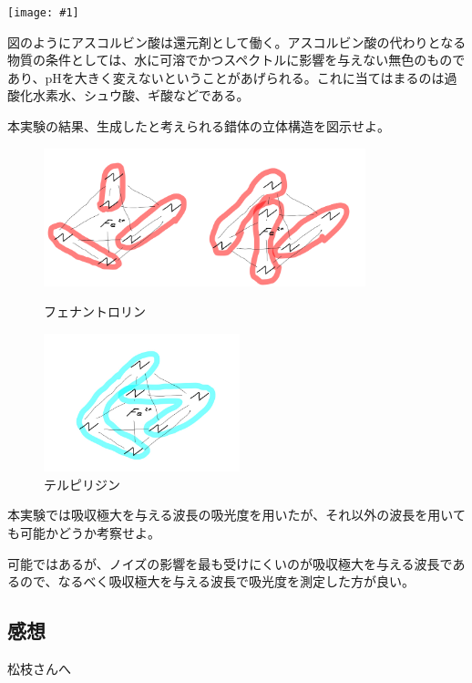 \documentclass[a4paper,papersize,dvipdfmx]{jsarticle}
\newcommand{\pict}[2]{\begin{center} \texttt{[image: \#1]} \end{center}}   %
\begin{document}
\pict{imgs/asc.jpeg}{12}

図のようにアスコルビン酸は還元剤として働く。アスコルビン酸の代わりとなる物質の条件としては、水に可溶でかつスペクトルに影響を与えない無色のものであり、pHを大きく変えないということがあげられる。これに当てはまるのは過酸化水素水、シュウ酸、ギ酸などである。

\begin{tcolorbox}[colback=white,colbacktitle=black!10!white,coltitle=black,title={3}]
本実験の結果、生成したと考えられる錯体の立体構造を図示せよ。
\end{tcolorbox}

\begin{figure}[H]
\begin{center}
\includegraphics[clip, height=4cm]{imgs/phe-c.jpeg}
\caption{フェナントロリン}
\end{center}

\begin{center}
\includegraphics[clip, height=4cm]{imgs/ter-c.jpeg}
\caption{テルピリジン}
\end{center}
\end{figure}

\begin{tcolorbox}[colback=white,colbacktitle=black!10!white,coltitle=black,title={4}]
本実験では吸収極大を与える波長の吸光度を用いたが、それ以外の波長を用いても可能かどうか考察せよ。
\end{tcolorbox}

可能ではあるが、ノイズの影響を最も受けにくいのが吸収極大を与える波長であるので、なるべく吸収極大を与える波長で吸光度を測定した方が良い。

\subsection*{感想}
松枝さんへ
\end{document}

